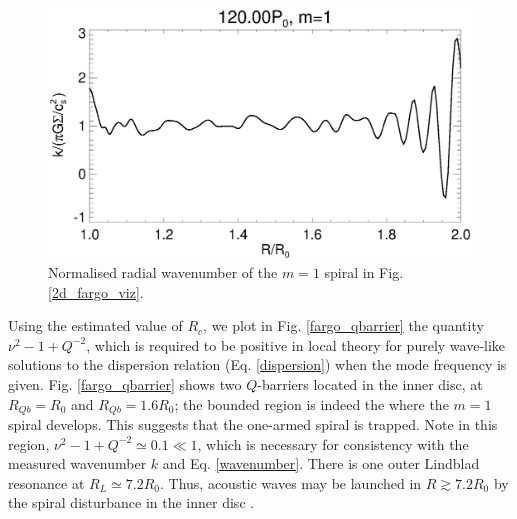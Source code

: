 \begin{figure}
  \includegraphics[width=\linewidth]{figures/m1_analysis_kr120_fargo.ps}
  \caption{Normalised radial wavenumber of the $m=1$ spiral in 
    Fig. \ref{2d_fargo_viz}.\label{fargo_wavenumber}} 
\end{figure}   


Using the estimated value of $R_c$, we plot in
Fig. \ref{fargo_qbarrier} the quantity $\nu^2 - 1 + Q^{-2}$, which is
required to be positive in local theory for purely wave-like
solutions to the dispersion relation (Eq. \ref{dispersion}) when the
mode frequency is given. %
Fig. \ref{fargo_qbarrier} shows two $Q$-barriers located in
the inner disc, at $R_{Qb}=R_0$ and $R_{Qb}=1.6R_0$; the bounded region is indeed the
where the $m=1$ spiral develops. This suggests that the one-armed 
spiral is trapped. Note in this region, $\nu^2 - 1 + 
Q^{-2}\simeq 0.1\ll 1$, which is necessary for consistency with 
the measured wavenumber $k$ and Eq. \ref{wavenumber}.  
There is one outer Lindblad resonance at $R_L\simeq
7.2R_0$. Thus, acoustic waves may be launched in $R\gtrsim 7.2R_0$ by
the spiral disturbance in the inner disc \citep{lin11b}. 


